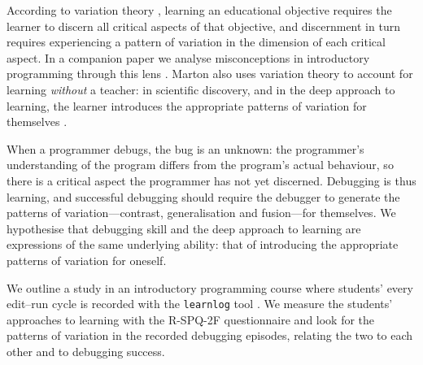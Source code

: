 According to variation theory \autocite[See][]{NCOL}, learning an educational
objective requires the learner to discern all critical aspects of that
objective, and discernment in turn requires experiencing a pattern of variation
in the dimension of each critical aspect.
In a companion paper we analyse misconceptions in introductory programming
through this lens \autocite{VTProgMisconceptions}.
Marton also uses variation theory to account for learning \emph{without} a
teacher: in scientific discovery, and in the deep approach to learning, the
learner introduces the appropriate patterns of variation for themselves
\autocite{NCOL}.

When a programmer debugs, the bug is an unknown: the programmer's understanding
of the program differs from the program's actual behaviour, so there is a
critical aspect the programmer has not yet discerned.
Debugging is thus learning, and successful debugging should require the
debugger to generate the patterns of variation---contrast, generalisation and
fusion---for themselves.
We hypothesise that debugging skill and the deep approach to learning are
expressions of the same underlying ability: that of introducing the appropriate
patterns of variation for oneself.

We outline a study in an introductory programming course where students' every
edit--run cycle is recorded with the \texttt{learnlog} tool \autocite{learnlog}.
We measure the students' approaches to learning with the R-SPQ-2F questionnaire
\autocite{RSPQ2F} and look for the patterns of variation in the recorded
debugging episodes, relating the two to each other and to debugging success.
